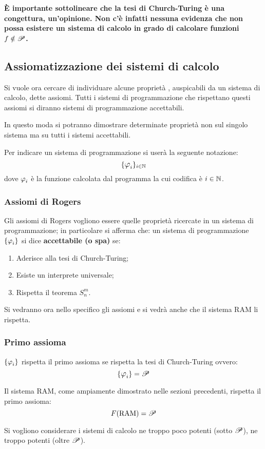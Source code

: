 \textbf{È importante sottolineare che la tesi di Church-Turing è una congettura, 
un'opinione. Non c'è infatti nessuna evidenza che non possa esistere un sistema di 
calcolo in grado di calcolare funzioni $f\notin\mathscr{P}$.}

\subsection{Assiomatizzazione dei sistemi di calcolo}
Si vuole ora cercare di individuare alcune proprietà , auspicabili da 
un sistema di calcolo, dette assiomi. Tutti i sistemi di programmazione che rispettano
questi assiomi si diranno sistemi di programmazione accettabili.

In questo moda si potranno dimostrare determinate proprietà non sul singolo sistema
ma su tutti i sistemi accettabili.

Per indicare un sistema di programmazione si userà la seguente notazione:
$$ \sistProg_{i\in\N} $$
dove $\semRAM_i$ è la funzione calcolata dal programma la cui codifica è 
$i\in\mathbb{N}$.

\subsubsection{Assiomi di Rogers}
Gli assiomi di Rogers vogliono essere quelle  proprietà ricercate in
un sistema di programmazione; in particolare si afferma che: un sistema di
programmazione $\sistProg$ si dice \textbf{accettabile (o spa)} se: 
\begin{enumerate}
    \item Aderisce alla tesi di Church-Turing;
    \item Esiste un interprete universale;
    \item Rispetta il teorema $S_n^m$.
\end{enumerate}

Si vedranno ora nello specifico gli assiomi e si vedrà anche che il sistema RAM
li rispetta.

\subsubsection*{Primo assioma}
$\sistProg$ rispetta il primo assioma se rispetta la tesi di Church-Turing
ovvero:
$$ \sistProg =\ricPar $$

Il sistema RAM, come ampiamente dimostrato nelle sezioni precedenti, rispetta
il primo assioma:
$$ F(\text{RAM})=\mathscr{P} $$

Si vogliono considerare i sistemi di calcolo ne troppo poco potenti (sotto $\mathscr{P}$),
ne troppo potenti (oltre $\mathscr{P}$).

